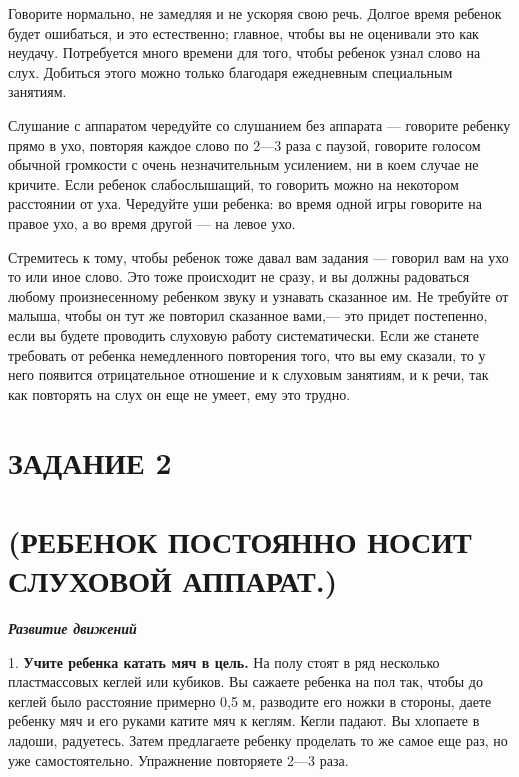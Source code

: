 \documentclass[a5paper]{book}
\renewcommand{\emph}[1]{\textit{#1}}
\begin{document}
Говорите нормально, не замедляя и не ускоряя свою речь. Долгое время
ребенок будет ошибаться, и это естественно; главное, чтобы вы не
оценивали это как неудачу. Потребуется много времени для того, чтобы
ребенок узнал слово на слух. Добиться этого можно только благодаря
ежедневным специальным занятиям.

Слушание с аппаратом чередуйте со слушанием без аппарата --- говорите
ребенку прямо в ухо, повторяя каждое слово по 2---3 раза с паузой,
говорите голосом обычной громкости с очень незначительным усилением, ни
в коем случае не кричите. Если ребенок слабослышащий, то говорить можно
на некотором расстоянии от уха. Чередуйте уши ребенка: во время одной
игры говорите на правое ухо, а во время другой --- на левое ухо.

Стремитесь к тому, чтобы ребенок тоже давал вам задания --- говорил вам
на ухо то или иное слово. Это тоже происходит не сразу, и вы должны
радоваться любому произнесенному ребенком звуку и узнавать сказанное им.
Не требуйте от малыша, чтобы он тут же повторил сказанное вами,--- это
придет постепенно, если вы будете проводить слуховую работу
систематически. Если же станете требовать от ребенка немедленного
повторения того, что вы ему сказали, то у него появится отрицательное
отношение и к слуховым занятиям, и к речи, так как повторять на слух он
еще не умеет, ему это трудно.

\section{ЗАДАНИЕ 2}\section*{(РЕБЕНОК ПОСТОЯННО НОСИТ СЛУХОВОЙ АППАРАТ.)}

\emph{\textbf{Развитие движений}}

1. \textbf{Учите ребенка катать мяч в цель.} На полу стоят в ряд
несколько пластмассовых кеглей или кубиков. Вы сажаете ребенка на пол
так, чтобы до кеглей было расстояние примерно 0,5 м, разводите его ножки
в стороны, даете ребенку мяч и его руками катите мяч к кеглям. Кегли
падают. Вы хлопаете в ладоши, радуетесь. Затем предлагаете ребенку
проделать то же самое еще раз, но уже самостоятельно. Упражнение
повторяете 2---3 раза.
\end{document}
